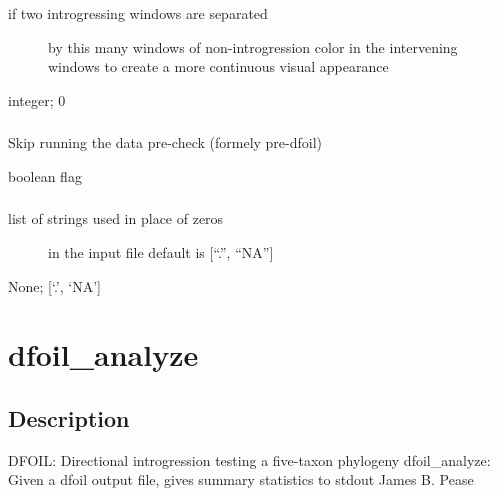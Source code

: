 \documentclass[letterpaper,12pt,english]{sphinxmanual}
\begin{document}
\subsubsection{}
\label{\detokenize{prog_desc:runlength}}\begin{description}
\item[{ if two introgressing windows are separated}] \leavevmode
by this many windows of non-introgression
color in the intervening windows to
create a more continuous visual appearance

\end{description}

 integer;  0


\subsubsection{}
\label{\detokenize{prog_desc:skip-pre-check}}
 Skip running the data pre-check (formely pre-dfoil)

 boolean flag


\subsubsection{}
\label{\detokenize{prog_desc:zerochar}}\begin{description}
\item[{ list of strings used in place of zeros}] \leavevmode
in the input file default is {[}“.”, “NA”{]}

\end{description}

 None;  {[}‘.’, ‘NA’{]}


\section{dfoil\_analyze}
\label{\detokenize{prog_desc:dfoil-analyze}}

\subsection{Description}
\label{\detokenize{prog_desc:id1}}
DFOIL: Directional introgression testing a five-taxon phylogeny
dfoil\_analyze: Given a dfoil output file, gives summary statistics to stdout
James B. Pease
\end{document}
